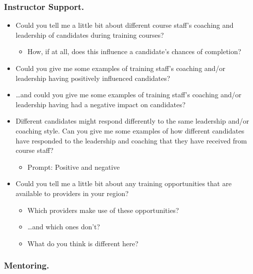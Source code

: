 \documentclass[
  12pt,
  a4paper,
]{book}
\providecommand{\tightlist}{%
  \setlength{\itemsep}{0pt}\setlength{\parskip}{0pt}}
\begin{document}
\hypertarget{instructor-support.}{%
\subsubsection{Instructor Support.}\label{instructor-support.}}

\begin{itemize}
\tightlist
\item
  Could you tell me a little bit about different course staff's coaching and leadership of candidates during training courses?

  \begin{itemize}
  \tightlist
  \item
    How, if at all, does this influence a candidate's chances of completion?
  \end{itemize}
\item
  Could you give me some examples of training staff's coaching and/or leadership having positively influenced candidates?
\item
  \ldots and could you give me some examples of training staff's coaching and/or leadership having had a negative impact on candidates?
\item
  Different candidates might respond differently to the same leadership and/or coaching style. Can you give me some examples of how different candidates have responded to the leadership and coaching that they have received from course staff?

  \begin{itemize}
  \tightlist
  \item
    Prompt: Positive and negative
  \end{itemize}
\item
  Could you tell me a little bit about any training opportunities that are available to providers in your region?

  \begin{itemize}
  \tightlist
  \item
    Which providers make use of these opportunities?
  \item
    \ldots and which ones don't?
  \item
    What do you think is different here?
  \end{itemize}
\end{itemize}

\hypertarget{mentoring.}{%
\subsubsection{Mentoring.}\label{mentoring.}}
\end{document}

